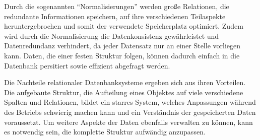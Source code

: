 Durch die sogenannten \enquote{Normalisierungen} werden große Relationen, die redundante Informationen speichern, auf ihre verschiedenen Teilaspekte heruntergebrochen und somit der verwendete Speicherplatz optimiert.
Zudem wird durch die Normalisierung die Datenkonsistenz gewährleistet und Datenredundanz verhindert, da jeder Datensatz nur an einer Stelle vorliegen kann.
Daten, die einer festen Struktur folgen, können dadurch einfach in die Datenbank persitiert sowie effizient abgefragt werden.

Die Nachteile relationaler Datenbanksysteme ergeben sich aus ihren Vorteilen.
Die aufgebaute Struktur, die Aufteilung eines Objektes auf viele verschiedene Spalten und Relationen, bildet ein starres System, welches Anpassungen während des Betriebs schwierig machen kann und ein Verständnis der gespeicherten Daten voraussetzt.
Um weitere Aspekte der Daten ebenfalls verwalten zu können, kann es notwendig sein, die komplette Struktur aufwändig anzupassen.

